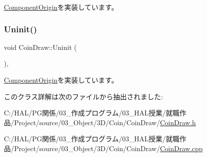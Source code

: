 \mbox{\hyperlink{class_component_origin_a9f674891257f2272b1636d8b6bb05d81}{Component\+Origin}}を実装しています。

\mbox{\label{class_coin_draw_a6484c22a5598e298f18e7cd6083cd551}} 
\subsubsection{\texorpdfstring{Uninit()}{Uninit()}}
{\footnotesize\ttfamily void Coin\+Draw\+::\+Uninit (\begin{DoxyParamCaption}{ }\end{DoxyParamCaption})\hspace{0.3cm}{\ttfamily [override]}, {\ttfamily [virtual]}}



\mbox{\hyperlink{class_component_origin_a9f89a93f9c1954bd53f9750e35e6089d}{Component\+Origin}}を実装しています。



このクラス詳解は次のファイルから抽出されました\+:\begin{DoxyCompactItemize}
\item 
C\+:/\+H\+A\+L/\+P\+G関係/03\+\_\+作成プログラム/03\+\_\+\+H\+A\+L授業/就職作品/\+Project/source/03\+\_\+\+Object/3\+D/\+Coin/\+Coin\+Draw/\mbox{\hyperlink{_coin_draw_8h}{Coin\+Draw.\+h}}\item 
C\+:/\+H\+A\+L/\+P\+G関係/03\+\_\+作成プログラム/03\+\_\+\+H\+A\+L授業/就職作品/\+Project/source/03\+\_\+\+Object/3\+D/\+Coin/\+Coin\+Draw/\mbox{\hyperlink{_coin_draw_8cpp}{Coin\+Draw.\+cpp}}\end{DoxyCompactItemize}
